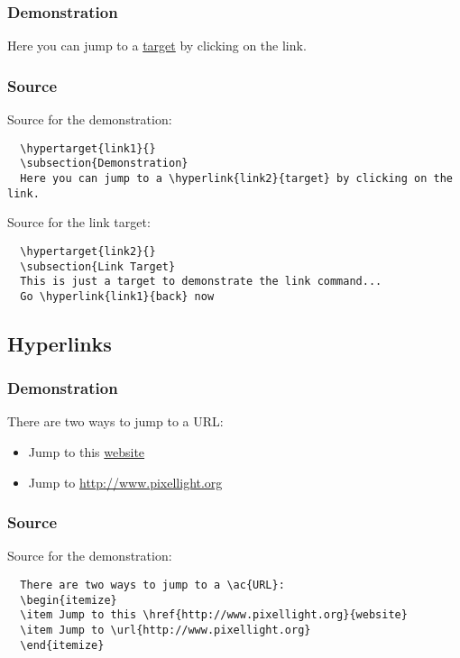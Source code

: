 \hypertarget{link1}{}
\subsubsection{Demonstration}
Here you can jump to a \hyperlink{link2}{target} by clicking on the link.


\subsubsection{Source}
Source for the demonstration:

\begin{verbatim}
  \hypertarget{link1}{}
  \subsection{Demonstration}
  Here you can jump to a \hyperlink{link2}{target} by clicking on the link.
\end{verbatim}

\noindent
Source for the link target:
\begin{verbatim}
  \hypertarget{link2}{}
  \subsection{Link Target}
  This is just a target to demonstrate the link command...
  Go \hyperlink{link1}{back} now
\end{verbatim}
\newpage


\subsection{Hyperlinks}


\subsubsection{Demonstration}
There are two ways to jump to a \ac{URL}:
\begin{itemize}
\item Jump to this \href{http://www.pixellight.org}{website}
\item Jump to \url{http://www.pixellight.org}
\end{itemize}


\subsubsection{Source}
Source for the demonstration:

\begin{verbatim}
  There are two ways to jump to a \ac{URL}:
  \begin{itemize}
  \item Jump to this \href{http://www.pixellight.org}{website}
  \item Jump to \url{http://www.pixellight.org}
  \end{itemize}
\end{verbatim}
\newpage
